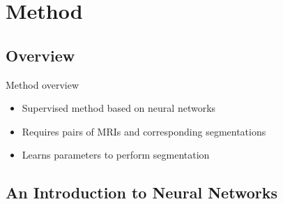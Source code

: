\documentclass{beamer}
\begin{document}
\section{Method}

\subsection{Overview}

\begin{frame}{Method overview}
\begin{itemize}
\item Supervised method based on neural networks
\item Requires pairs of MRIs and corresponding segmentations
\item Learns parameters to perform segmentation
\end{itemize}
\end{frame}

\subsection{An Introduction to Neural Networks}
\end{document}
